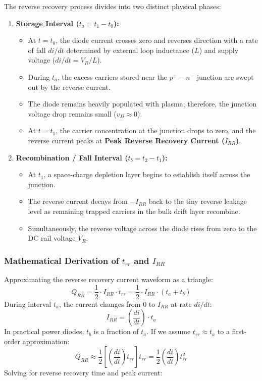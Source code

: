 \documentclass[11pt,a4paper]{article}
\begin{document}
The reverse recovery process divides into two distinct physical phases:
\begin{enumerate}[leftmargin=*]
  \item \textbf{Storage Interval ($t_a = t_1 - t_0$):}
    \begin{itemize}
      \item At $t = t_0$, the diode current crosses zero and reverses direction with a rate of fall $di/dt$ determined by external loop inductance ($L$) and supply voltage ($di/dt = V_R / L$).
      \item During $t_a$, the excess carriers stored near the $p^+-n^-$ junction are swept out by the reverse current.
      \item The diode remains heavily populated with plasma; therefore, the junction voltage drop remains small ($v_D \approx 0$).
      \item At $t = t_1$, the carrier concentration at the junction drops to zero, and the reverse current peaks at \textbf{Peak Reverse Recovery Current ($I_{RR}$)}.
    \end{itemize}
  \item \textbf{Recombination / Fall Interval ($t_b = t_2 - t_1$):}
    \begin{itemize}
      \item At $t_1$, a space-charge depletion layer begins to establish itself across the junction.
      \item The reverse current decays from $-I_{RR}$ back to the tiny reverse leakage level as remaining trapped carriers in the bulk drift layer recombine.
      \item Simultaneously, the reverse voltage across the diode rises from zero to the DC rail voltage $V_R$.
    \end{itemize}
\end{enumerate}

\subsubsection{Mathematical Derivation of $t_{rr}$ and $I_{RR}$}
Approximating the reverse recovery current waveform as a triangle:
\begin{equation}
Q_{RR} = \frac{1}{2} \cdot I_{RR} \cdot t_{rr} = \frac{1}{2} \cdot I_{RR} \cdot (t_a + t_b)
\end{equation}
During interval $t_a$, the current changes from $0$ to $I_{RR}$ at rate $di/dt$:
\begin{equation}
I_{RR} = \left(\frac{di}{dt}\right) \cdot t_a
\end{equation}
In practical power diodes, $t_b$ is a fraction of $t_a$. If we assume $t_{rr} \approx t_a$ to a first-order approximation:
\begin{equation}
Q_{RR} \approx \frac{1}{2} \left[\left(\frac{di}{dt}\right) t_{rr}\right] t_{rr} = \frac{1}{2} \left(\frac{di}{dt}\right) t_{rr}^2
\end{equation}
Solving for reverse recovery time and peak current:
\end{document}
